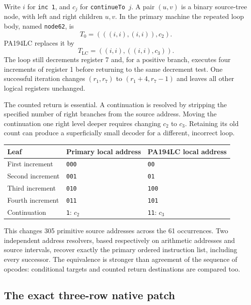 \documentclass[11pt,a4paper]{article}
\begin{document}
Write $i$ for \texttt{inc 1}, and $c_j$ for
\texttt{continueTo $j$}. A pair $(u,v)$ is a binary source-tree node,
with left and right children $u,v$. In the primary machine the repeated
loop body, named \texttt{node62}, is
\[
T_0=(((i,i),(i,i)),c_2).
\]
PA194LC replaces it by
\[
\boxed{T_{\mathrm{LC}}=((i,i),((i,i),c_3)).}
\]
The loop still decrements register 7 and, for a positive branch, executes
four increments of register 1 before returning to the same decrement
test. One successful iteration changes $(r_1,r_7)$ to
$(r_1+4,r_7-1)$ and leaves all other logical registers unchanged.

The counted return is essential. A continuation is resolved by stripping
the specified number of right branches from the source address. Moving
the continuation one right level deeper requires changing $c_2$ to $c_3$.
Retaining its old count can produce a superficially small decoder for a
different, incorrect loop.

\begin{center}
\begin{tabular}{@{}lll@{}}
\toprule
Leaf & Primary local address & PA194LC local address\\
\midrule
First increment & \texttt{000} & \texttt{00}\\
Second increment & \texttt{001} & \texttt{01}\\
Third increment & \texttt{010} & \texttt{100}\\
Fourth increment & \texttt{011} & \texttt{101}\\
Continuation & \texttt{1}: $c_2$ & \texttt{11}: $c_3$\\
\bottomrule
\end{tabular}
\end{center}

This changes 305 primitive source addresses across the 61 occurrences.
Two independent address resolvers, based respectively on arithmetic
addresses and source intervals, recover exactly the primary ordered
instruction list, including every successor. The equivalence is stronger
than agreement of the sequence of opcodes: conditional targets and
counted return destinations are compared too.

\subsection{The exact three-row native patch}
\end{document}
